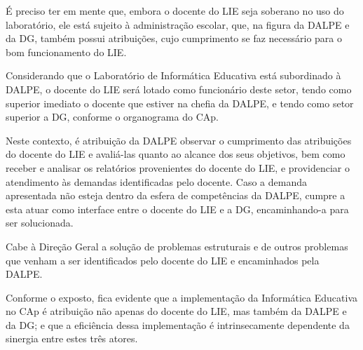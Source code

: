 É preciso ter em mente que, embora o docente do LIE seja soberano no uso do laboratório, ele está sujeito à administração escolar, que, na figura da DALPE e da DG, também possui atribuições, cujo cumprimento se faz necessário para o bom funcionamento do LIE.

Considerando que o Laboratório de Informática Educativa está subordinado à DALPE, o docente do LIE será lotado como funcionário deste setor, tendo como superior imediato o docente que estiver na chefia da DALPE, e tendo como setor superior a DG, conforme o organograma do CAp.

Neste contexto, é atribuição da DALPE observar o cumprimento das atribuições do docente do LIE e avaliá-las quanto ao alcance dos seus objetivos, bem como receber e analisar os relatórios provenientes do docente do LIE, e providenciar o atendimento às demandas identificadas pelo docente. Caso a demanda apresentada não esteja dentro da esfera de competências da DALPE, cumpre a esta atuar como interface entre o docente do LIE e a DG, encaminhando-a para ser solucionada.

Cabe à Direção Geral a solução de problemas estruturais e de outros problemas que venham a ser identificados pelo docente do LIE e encaminhados pela DALPE.

Conforme o exposto, fica evidente que a implementação da Informática Educativa no CAp é atribuição não apenas do docente do LIE, mas também da DALPE e da DG; e que a eficiência dessa implementação é intrinsecamente dependente da sinergia entre estes três atores.
